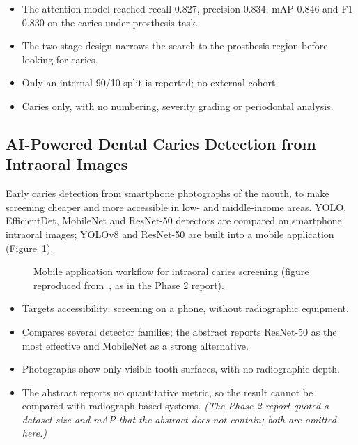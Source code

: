 \begin{itemize}
\item The attention model reached recall 0.827, precision 0.834, mAP 0.846 and F1 0.830 on the
  caries-under-prosthesis task.
\item The two-stage design narrows the search to the prosthesis region before looking for caries.
\end{itemize}
\begin{itemize}
\item Only an internal 90/10 split is reported; no external cohort.
\item Caries only, with no numbering, severity grading or periodontal analysis.
\end{itemize}

\subsection{AI-Powered Dental Caries Detection from Intraoral Images~\cite{khuwaja2024ai}}
 Early caries detection from smartphone photographs of the mouth, to make
screening cheaper and more accessible in low- and middle-income areas.
 YOLO, EfficientDet, MobileNet and ResNet-50 detectors are compared on
smartphone intraoral images; YOLOv8 and ResNet-50 are built into a mobile application
(Figure~\ref{fig:lit-khuwaja}).

\begin{figure}[!htbp]
\centering
{}
\caption[Mobile application workflow for intraoral caries screening]{Mobile application workflow for
intraoral caries screening (figure reproduced from~\cite{khuwaja2024ai}, as in the Phase 2 report).}
\label{fig:lit-khuwaja}
\end{figure}

\begin{itemize}
\item Targets accessibility: screening on a phone, without radiographic equipment.
\item Compares several detector families; the abstract reports ResNet-50 as the most effective and
  MobileNet as a strong alternative.
\end{itemize}
\begin{itemize}
\item Photographs show only visible tooth surfaces, with no radiographic depth.
\item The abstract reports no quantitative metric, so the result cannot be compared with
  radiograph-based systems. \emph{(The Phase 2 report quoted a dataset size and mAP that the abstract
  does not contain; both are omitted here.)}
\end{itemize}

